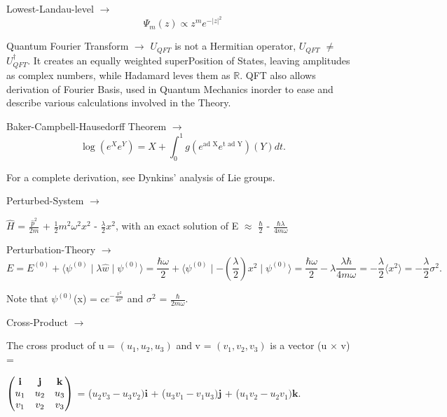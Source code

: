 \documentclass[a4paper, 10pt, onepage]{elegantbook}
\begin{document}
{Lowest-Landau-level $\rightarrow$  
\begin{equation}
\Psi_m(z) \propto z^m e^{-|z|^2}
\end{equation}

\begin{remark}
Quantum Fourier Transform $\rightarrow$ $U_{QFT}$ is not a Hermitian operator,
$U_{QFT}$ $\neq$ $U_{QFT}^{\dagger}$. It creates an equally weighted superPosition of States, leaving amplitudes as 
complex numbers,
while Hadamard leves them as $\mathbb R$. QFT also allows derivation of Fourier Basis, used in Quantum Mechanics 
inorder to ease and describe  various calculations involved in the Theory.
\end{remark}

Baker-Campbell-Hausedorff Theorem $\rightarrow$ 
\label{eq:Baker-Campbell-Hausedorff Theorem}
\begin{equation}
\log(e^Xe^Y) = X + \int_{0}^1 g(e^{\text{ad X}} e^{\text{t ad Y}})(Y)dt.
\end{equation}

For a complete derivation, see Dynkins' analysis of Lie groups.

Perturbed-System $\rightarrow$  

$\hat H$ = $\frac{\hat p^2}{2m}$ + $\frac{1}{2} m^2 \omega^2 x^2$ - $\frac{\lambda}{2} x^2$,
with an exact solution of E $\approx$ $\frac{\hbar}{2}$ - $\frac{\hbar \lambda}{4m \omega}$  

Perturbation-Theory $\rightarrow$ 
\begin{equation}
E = E^{(0)} + \langle \psi^{(0)} \mid \lambda \hat w \mid \psi^{(0)} \rangle = \frac{\hbar \omega}{2} + \langle 
\psi^{(0)} \mid {-(\frac{\lambda}{2}) x^2} \mid  \psi^{(0)} \rangle =  \frac{\hbar \omega}{2} - \lambda \frac{\lambda 
\hbar}{4m \omega} =  - \frac{\lambda}{2} \langle x^2 \rangle =  - \frac{\lambda}{2} \sigma^2.
\end{equation}

Note that $\psi^{(0)}$(x) = c$e^{- \frac{x^2}{4 \sigma^2}}$ and $\sigma^2$ = $\frac{\hbar}{2m \omega}$.  

Cross-Product $\rightarrow$ 
    
The cross product of u = $(u_1,u_2,u_3)$ and v = $(v_1,v_2,v_3)$ is a vector
(u $\times$ v) = 

$\begin{pmatrix} \mathbf{i} & \mathbf{j} & \mathbf{k} \cr u_1 & u_2 & u_3 \cr v_1 & v_2 & v_3 \end{pmatrix}$ =
($u_2v_3 - u_3v_2)\mathbf{i}$ + ($u_3v_1 - v_1u_3)\mathbf{j}$ + ($u_1v_2 - u_2v_1)\mathbf{k}$.  
    
}
\end{document}
